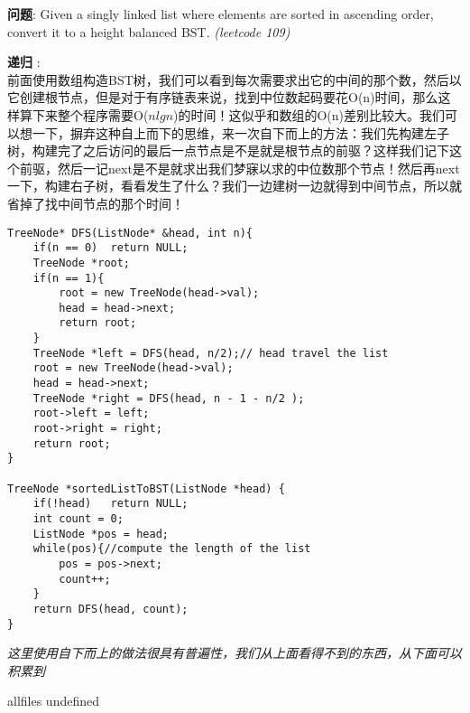 \documentclass{article}
\begin{document}
\begin{CJK}{UTF8}{gbsn}     %

\else
	
\begin{description}
	\item{\textbf{问题}}: Given a singly linked list where elements are sorted in ascending order, convert it to a height balanced BST. \textit{(leetcode 109)}
	\item{\textbf{递归}} : 
	\\前面使用数组构造BST树，我们可以看到每次需要求出它的中间的那个数，然后以它创建根节点，但是对于有序链表来说，找到中位数起码要花O(n)时间，那么这样算下来整个程序需要O($nlgn$)的时间！这似乎和数组的O(n)差别比较大。我们可以想一下，摒弃这种自上而下的思维，来一次自下而上的方法：我们先构建左子树，构建完了之后访问的最后一点节点是不是就是根节点的前驱？这样我们记下这个前驱，然后一记next是不是就求出我们梦寐以求的中位数那个节点！然后再next一下，构建右子树，看看发生了什么？我们一边建树一边就得到中间节点，所以就省掉了找中间节点的那个时间！
	\begin{lstlisting}
TreeNode* DFS(ListNode* &head, int n){
	if(n == 0)	return NULL;
	TreeNode *root;
	if(n == 1){
		root = new TreeNode(head->val);
		head = head->next;
		return root;
	}
	TreeNode *left = DFS(head, n/2);// head travel the list
	root = new TreeNode(head->val);
	head = head->next; 
	TreeNode *right = DFS(head, n - 1 - n/2 );
	root->left = left;
	root->right = right;
	return root;
}

TreeNode *sortedListToBST(ListNode *head) {
	if(!head)	return NULL;
	int count = 0;
	ListNode *pos = head;
	while(pos){//compute the length of the list
		pos = pos->next;
		count++;
	}
	return DFS(head, count);
}
	\end{lstlisting}
	\textit{这里使用自下而上的做法很具有普遍性，我们从上面看得不到的东西，从下面可以积累到}
\end{description}

\fi

\ifx allfiles undefined
\end{CJK}
\end{document}
